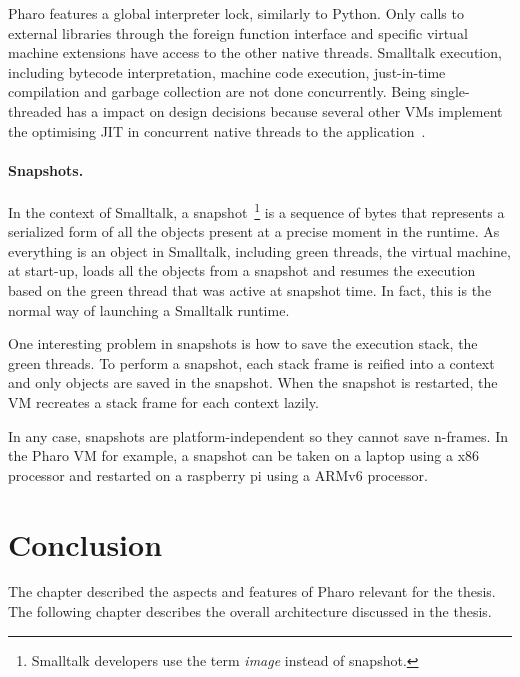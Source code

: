 \documentclass[a4paper,12pt,twoside]{../includes/ThesisStyle}
\begin{document}
Pharo features a global interpreter lock, similarly to Python. Only calls to external libraries through the foreign function interface and specific virtual machine extensions have access to the other native threads. Smalltalk execution, including bytecode interpretation, machine code execution, just-in-time compilation and garbage collection are not done concurrently. Being single-threaded has a impact on design decisions because several other VMs implement the optimising JIT in concurrent native threads to the application~\cite{Arn00}.


\paragraph{Snapshots.}
\label{par:snapshot}

In the context of Smalltalk, a snapshot~\footnote{Smalltalk developers use the term \emph{image} instead of snapshot.} is a sequence of bytes that represents a serialized form of all the objects present at a precise moment in the runtime. As everything is an object in Smalltalk, including green threads, the virtual machine, at start-up, loads all the objects from a snapshot and resumes the execution based on the green thread that was active at snapshot time. In fact, this is the normal way of launching a Smalltalk runtime. 

One interesting problem in snapshots is how to save the execution stack, \ie the green threads. To perform a snapshot, each stack frame is reified into a context and only objects are saved in the snapshot. When the snapshot is restarted, the VM recreates a stack frame for each context lazily. 

In any case, snapshots are platform-independent so they cannot save n-frames. In the Pharo VM for example, a snapshot can be taken on a laptop using a x86 processor and restarted on a raspberry pi using a ARMv6 processor.


\section*{Conclusion} 

The chapter described the aspects and features of Pharo relevant for the thesis. The following chapter describes the overall architecture discussed in the thesis.

\ifx\wholebook\relax\else
    
\end{document}
